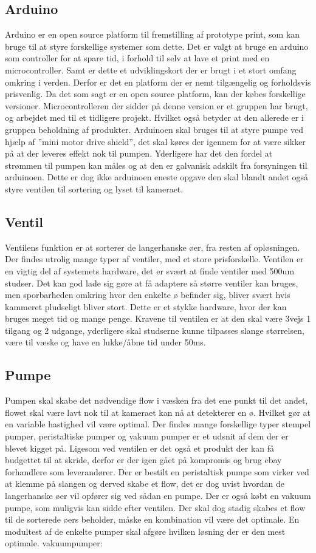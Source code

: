 \subsection{Arduino}
Arduino er en open source platform til fremstilling af prototype print, som kan bruge til at styre forskellige systemer som dette. Det er valgt at bruge en arduino som controller for at spare tid, i forhold til selv at lave et print med en microcontroller. Samt er dette et udviklingskort der er brugt i et stort omfang omkring i verden. Derfor er det en platform der er nemt tilgængelig og forholdsvis prisvenlig. Da det som sagt er en open source platform, kan der købes forskellige versioner. Microcontrolleren der sidder på denne version er et gruppen har brugt, og arbejdet med til et tidligere projekt. Hvilket også betyder at den allerede er i gruppen beholdning af produkter.
Arduinoen skal bruges til at styre pumpe ved hjælp af ”mini motor drive shield”, det skal køres der igennem for at være sikker på at der leveres effekt nok til pumpen. Yderligere har det den fordel at strømmen til pumpen kan måles og at den er galvanisk adskilt fra forsyningen til arduinoen. Dette er dog ikke arduinoen eneste opgave den skal blandt andet også styre ventilen til sortering og lyset til kameraet.

\subsection{Ventil}
Ventilens funktion er at sorterer de langerhanske øer, fra resten af opløsningen. Der findes utrolig mange typer af ventiler, med et store prisforskelle. Ventilen er en vigtig del af systemets hardware, det er svært at finde ventiler med 500um studser. Det kan god lade sig gøre at få adaptere så større ventiler kan bruges, men sporbarheden omkring hvor den enkelte ø befinder sig, bliver svært hvis kammeret pludseligt bliver stort. Dette er et stykke hardware, hvor der kan bruges meget tid og mange penge.
Kravene til ventilen er at den skal være 3vejs 1 tilgang og 2 udgange, yderligere skal studserne kunne tilpasses slange størrelsen, være til væske og have en lukke/åbne tid under 50ms.

\subsection{Pumpe}
Pumpen skal skabe det nødvendige flow i væsken fra det ene punkt til det andet, flowet skal være lavt nok til at kameraet kan nå at detekterer en ø. Hvilket gør at en variable hastighed vil være optimal. Der findes mange forskellige typer stempel pumper, peristaltiske pumper og vakuum pumper er et udsnit af dem der er blevet kigget på. Ligesom ved ventilen er det også et produkt der kan få budgettet til at skride, derfor er der igen gået på kompromis og brug ebay forhandlere som leverandører. Der er bestilt en peristaltisk pumpe som virker ved at klemme på slangen og derved skabe et flow, det er dog uvist hvordan de langerhanske øer vil opfører sig ved sådan en pumpe. Der er også købt en vakuum pumpe, som muligvis kan sidde efter ventilen. Der skal dog stadig skabes et flow til de sorterede øers beholder, måske en kombination vil være det optimale. En modultest af de enkelte pumper skal afgøre hvilken løsning der er den mest optimale. 
vakuumpumper:
